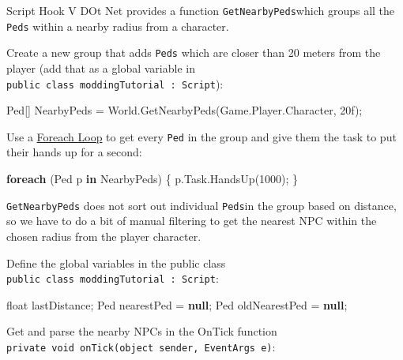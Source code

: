 \documentclass[
  openany]{book}
\newenvironment{Shaded}{\begin{snugshade}}{\end{snugshade}}
\newcommand{\DataTypeTok}[1]{\textcolor[rgb]{0.13,0.29,0.53}{#1}}
\newcommand{\DecValTok}[1]{\textcolor[rgb]{0.00,0.00,0.81}{#1}}
\newcommand{\FunctionTok}[1]{\textcolor[rgb]{0.00,0.00,0.00}{#1}}
\newcommand{\KeywordTok}[1]{\textcolor[rgb]{0.13,0.29,0.53}{\textbf{#1}}}
\newcommand{\NormalTok}[1]{#1}
\begin{document}
Script Hook V DOt Net provides a function \texttt{GetNearbyPeds}which groups all the \texttt{Peds} within a nearby radius from a character.

Create a new group that adds \texttt{Peds} which are closer than 20 meters from the player (add that as a global variable in \texttt{public\ class\ moddingTutorial\ :\ Script}):

\begin{Shaded}
\begin{Highlighting}[]
\NormalTok{Ped[] NearbyPeds = World.}\FunctionTok{GetNearbyPeds}\NormalTok{(Game.}\FunctionTok{Player}\NormalTok{.}\FunctionTok{Character}\NormalTok{, 20f);}
\end{Highlighting}
\end{Shaded}

Use a \href{https://www.simplilearn.com/tutorials/asp-dot-net-tutorial/csharp-foreach\#:~:text=The\%20foreach\%20loop\%20in\%20C\%23,readable\%20alternative\%20to\%20for\%20loop.}{Foreach Loop} to get every \texttt{Ped} in the group and give them the task to put their hands up for a second:

\begin{Shaded}
\begin{Highlighting}[]
\KeywordTok{foreach}\NormalTok{ (Ped p }\KeywordTok{in}\NormalTok{ NearbyPeds)}
\NormalTok{\{}
\NormalTok{    p.}\FunctionTok{Task}\NormalTok{.}\FunctionTok{HandsUp}\NormalTok{(}\DecValTok{1000}\NormalTok{);}
\NormalTok{\}}
\end{Highlighting}
\end{Shaded}

\texttt{GetNearbyPeds} does not sort out individual \texttt{Peds}in the group based on distance, so we have to do a bit of manual filtering to get the nearest NPC within the chosen radius from the player character.

Define the global variables in the public class \texttt{public\ class\ moddingTutorial\ :\ Script}:

\begin{Shaded}
\begin{Highlighting}[]
\DataTypeTok{float}\NormalTok{ lastDistance;}
\NormalTok{Ped nearestPed = }\KeywordTok{null}\NormalTok{;}
\NormalTok{Ped oldNearestPed = }\KeywordTok{null}\NormalTok{;}
\end{Highlighting}
\end{Shaded}

Get and parse the nearby NPCs in the OnTick function \texttt{private\ void\ onTick(object\ sender,\ EventArgs\ e)}:
\end{document}
